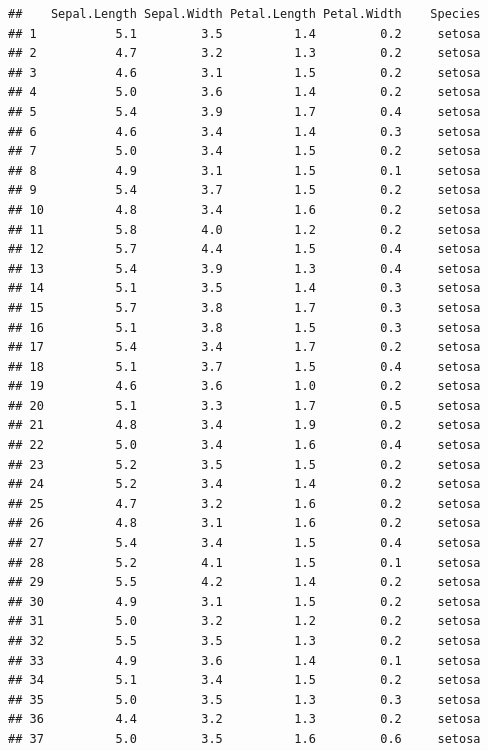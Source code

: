 \documentclass[
]{article}
\begin{document}
\begin{verbatim}
##    Sepal.Length Sepal.Width Petal.Length Petal.Width    Species
## 1           5.1         3.5          1.4         0.2     setosa
## 2           4.7         3.2          1.3         0.2     setosa
## 3           4.6         3.1          1.5         0.2     setosa
## 4           5.0         3.6          1.4         0.2     setosa
## 5           5.4         3.9          1.7         0.4     setosa
## 6           4.6         3.4          1.4         0.3     setosa
## 7           5.0         3.4          1.5         0.2     setosa
## 8           4.9         3.1          1.5         0.1     setosa
## 9           5.4         3.7          1.5         0.2     setosa
## 10          4.8         3.4          1.6         0.2     setosa
## 11          5.8         4.0          1.2         0.2     setosa
## 12          5.7         4.4          1.5         0.4     setosa
## 13          5.4         3.9          1.3         0.4     setosa
## 14          5.1         3.5          1.4         0.3     setosa
## 15          5.7         3.8          1.7         0.3     setosa
## 16          5.1         3.8          1.5         0.3     setosa
## 17          5.4         3.4          1.7         0.2     setosa
## 18          5.1         3.7          1.5         0.4     setosa
## 19          4.6         3.6          1.0         0.2     setosa
## 20          5.1         3.3          1.7         0.5     setosa
## 21          4.8         3.4          1.9         0.2     setosa
## 22          5.0         3.4          1.6         0.4     setosa
## 23          5.2         3.5          1.5         0.2     setosa
## 24          5.2         3.4          1.4         0.2     setosa
## 25          4.7         3.2          1.6         0.2     setosa
## 26          4.8         3.1          1.6         0.2     setosa
## 27          5.4         3.4          1.5         0.4     setosa
## 28          5.2         4.1          1.5         0.1     setosa
## 29          5.5         4.2          1.4         0.2     setosa
## 30          4.9         3.1          1.5         0.2     setosa
## 31          5.0         3.2          1.2         0.2     setosa
## 32          5.5         3.5          1.3         0.2     setosa
## 33          4.9         3.6          1.4         0.1     setosa
## 34          5.1         3.4          1.5         0.2     setosa
## 35          5.0         3.5          1.3         0.3     setosa
## 36          4.4         3.2          1.3         0.2     setosa
## 37          5.0         3.5          1.6         0.6     setosa

\end{verbatim}
\end{document}

